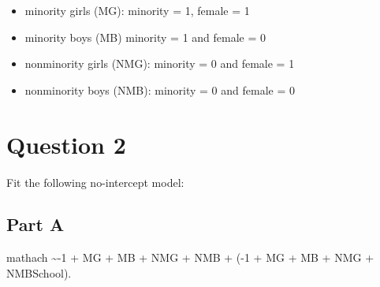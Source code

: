 \documentclass[]{article}
\newenvironment{Shaded}{\begin{snugshade}}{\end{snugshade}}
\newcommand{\KeywordTok}[1]{\textcolor[rgb]{0.13,0.29,0.53}{\textbf{#1}}}
\newcommand{\DataTypeTok}[1]{\textcolor[rgb]{0.13,0.29,0.53}{#1}}
\newcommand{\DecValTok}[1]{\textcolor[rgb]{0.00,0.00,0.81}{#1}}
\newcommand{\StringTok}[1]{\textcolor[rgb]{0.31,0.60,0.02}{#1}}
\newcommand{\OperatorTok}[1]{\textcolor[rgb]{0.81,0.36,0.00}{\textbf{#1}}}
\newcommand{\NormalTok}[1]{#1}
\begin{document}
\begin{itemize}
\item minority girls (MG): minority = 1, female = 1  
\item minority boys (MB) minority = 1 and female = 0 
\item nonminority girls (NMG): minority = 0 and female = 1 
\item nonminority boys (NMB): minority = 0 and female = 0  
\end{itemize}

\begin{Shaded}
\end{Shaded}

\section{Question 2}\label{question-2}

Fit the following no-intercept model:

\subsection{Part A}\label{part-a}

mathach \textasciitilde{}-1 + MG + MB + NMG + NMB + (-1 + MG + MB + NMG
+ NMB\textbar{}School).
\end{document}
